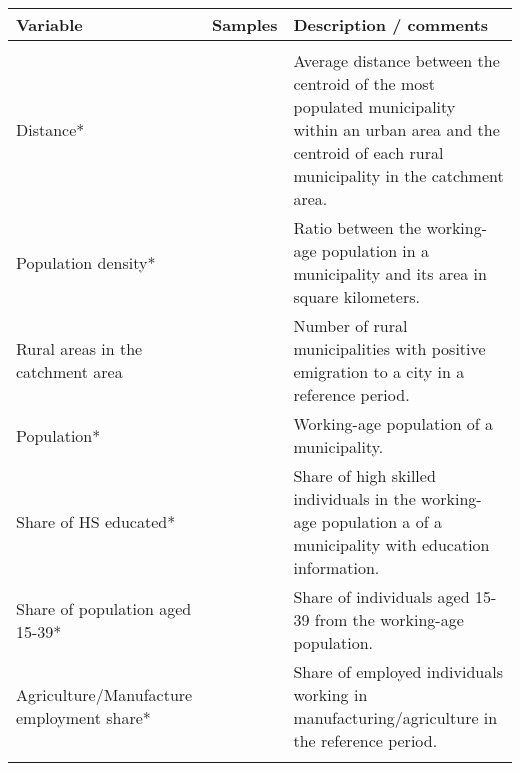 
  \renewcommand{\arraystretch}{1.3}
    \begin{tabular}{p{14.445em}rp{37.89em}}
    \multicolumn{1}{l}{\textbf{Variable}} & \multicolumn{1}{l}{\textbf{Samples}} & \multicolumn{1}{l}{\textbf{Description / comments}} \\
    \midrule
    \multicolumn{1}{r}{} &       & \multicolumn{1}{r}{} \\

  Distance* &       & Average distance between the centroid of the most populated municipality within an urban area and the centroid of each rural municipality in the catchment area.  \\
    Population density* &       & Ratio between the working-age population in a municipality and its area in square kilometers. \\
    Rural areas in the catchment area &       & Number of rural municipalities with positive emigration to a city in a reference period. \\
    Population* &       & Working-age population of a municipality. \\
    Share of HS educated* &       & Share of high skilled individuals in the working-age population a of a municipality with education information. \\
    Share of population aged 15-39* &       & Share of individuals aged 15-39 from the working-age population. \\
    Agriculture/Manufacture employment share* &       & Share of employed individuals working in manufacturing/agriculture in the reference period. \\
\multicolumn{1}{r}{} &       & \multicolumn{1}{r}{} \\
    \bottomrule

    \end{tabular}%


